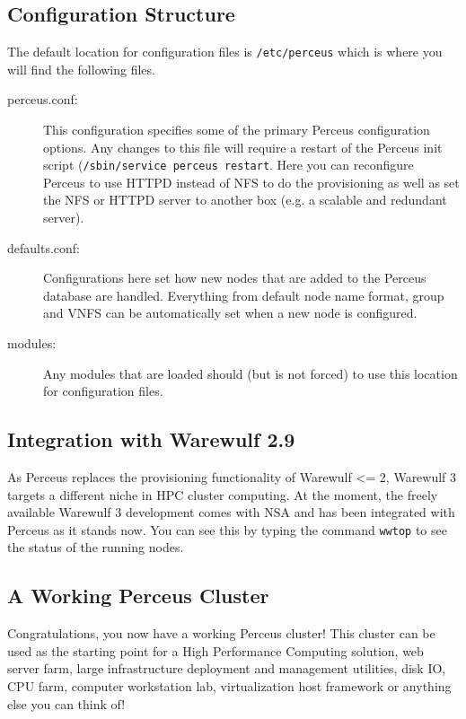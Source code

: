 \documentclass[10pt,letterpaper]{article}
\begin{document}
\subsection{Configuration Structure}
The default location for configuration files is {\tt /etc/perceus} which is
where you will find the following files.

\begin{description}
\item[perceus.conf:] This configuration specifies some of the primary Perceus
configuration options. Any changes to this file will require a restart of the
Perceus init script ({\tt /sbin/service perceus restart}. Here you can
reconfigure Perceus to use HTTPD instead of NFS to do the provisioning as well
as set the NFS or HTTPD server to another box (e.g. a scalable and redundant
server).

\item[defaults.conf:] Configurations here set how new nodes that are added to
the Perceus database are handled. Everything from default node name format,
group and VNFS can be automatically set when a new node is configured.

\item[modules:] Any modules that are loaded should (but is not forced) to use
this location for configuration files.

\end{description}

\subsection{Integration with Warewulf 2.9}
As Perceus replaces the provisioning functionality of Warewulf <= 2,
Warewulf 3 targets a different niche in HPC cluster computing. At the
moment, the freely available Warewulf 3 development comes with NSA and has
been integrated with Perceus as it stands now. You can see this by typing
the command {\tt wwtop} to see the status of the running nodes.

\subsection{A Working Perceus Cluster}
Congratulations, you now have a working Perceus cluster! This cluster can be
used as the starting point for a High Performance Computing solution, web
server farm, large infrastructure deployment and management utilities, disk IO,
CPU farm, computer workstation lab, virtualization host framework or anything
else you can think of!
\end{document}
